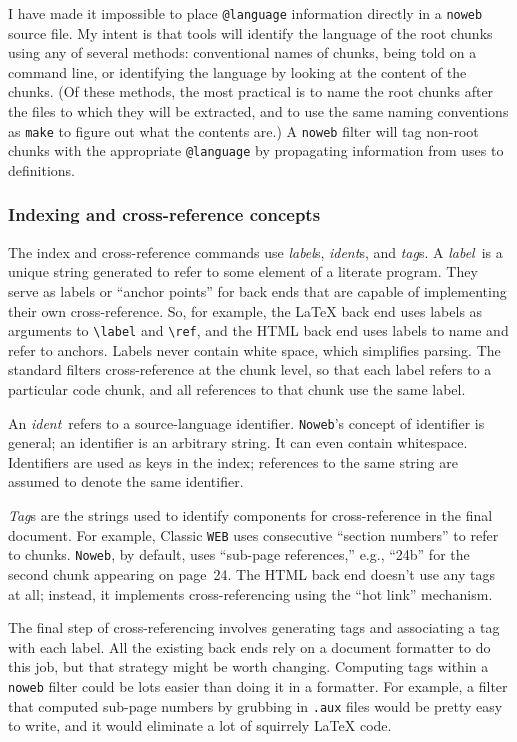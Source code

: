 \documentclass{article}
\makeatletter
\newcommand\kw[1]{\texttt{@#1}}
\renewcommand\label{{\rm\it label\/}}
\newcommand\tag{{\rm\it tag\/}}
\newcommand\ident{{\rm\it ident\/}}
\makeatother
\begin{document}
I have made it impossible to place \kw{language} information directly
in a \texttt{noweb} source file.
My intent is that tools will identify the language of the root chunks
using any of several methods: conventional names of chunks, being told
on a command line, or identifying the language by looking at the
content of the chunks.
(Of these methods, the most practical is to name the root chunks after
the files to which they will be extracted, and to use the same naming
conventions as \texttt{make} to figure out what the contents are.)
A \texttt{noweb} filter will tag non-root chunks with the appropriate
\kw{language} by propagating information from uses to definitions.




\subsubsection{Indexing and cross-reference concepts}


The index and cross-reference commands use \label s, \ident s, and \tag s.
A \label\ is a unique string generated to refer to some element of a
literate program.
They serve as labels or ``anchor points'' for back ends that are
capable of implementing their own cross-reference.
So, for example, the {\LaTeX} back end uses labels as arguments to \verb+\label+
and \verb+\ref+, and the HTML back end uses labels to name and refer
to anchors.
Labels never contain white space, which simplifies parsing.
The standard filters cross-reference at the chunk level, so that each
label refers to a particular code chunk, and all references to that
chunk use the same label.

An \ident\ refers to a source-language identifier.
{\tt Noweb}'s concept of identifier is general; an identifier is
an arbitrary string.
It can even contain whitespace.
Identifiers are used as keys in the index; references to the same
string are assumed to denote the same identifier.

{\rm\it Tag\/}s are the strings used to identify components for
cross-reference in the final document.
For example, Classic {\tt WEB} uses consecutive ``section numbers'' to
refer to chunks.
{\tt Noweb}, by default, uses ``sub-page references,'' e.g., ``24b''
for the second chunk appearing on page~24.
The HTML back end doesn't use any tags at all; instead, it
implements cross-referencing using the ``hot link'' mechanism.

The final step of cross-referencing involves generating tags and
associating a tag with each label.
All the existing back ends rely on a document formatter to do this
job, but that strategy might be worth changing.
Computing tags within a {\tt noweb} filter could be lots easier than
doing it in a formatter.
For example, a filter that computed sub-page numbers by grubbing in
{\tt .aux} files would be pretty easy to write, and it would eliminate
a lot of squirrely {\LaTeX} code.
\end{document}
